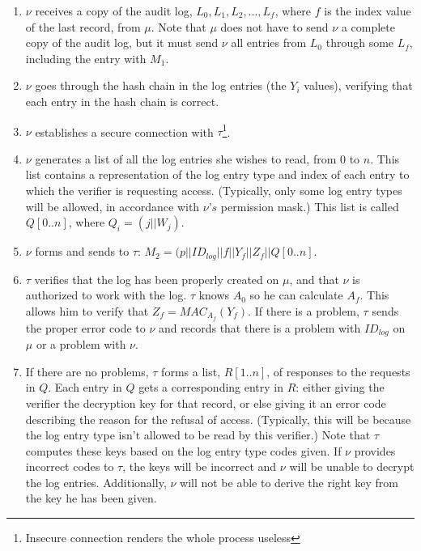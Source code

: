 \documentclass[12pt, letter]{article}
\begin{document}
\begin{enumerate}
    \item  $\nu$ receives a copy of the audit log, $L_0, L_1, L_2,...,L_f$, where $f$ is the index value of the last record, from $\mu$. Note that $\mu$ does not have to send $\nu$ a complete copy of the audit log, but it must send $\nu$ all entries from $L_0$ through some $L_f$, including the entry with $M_1$.
    
    \item $\nu$ goes through the hash chain in the log entries (the $Y_i$ values), verifying that each entry in the hash chain is correct.
    
    \item $\nu$ establishes a secure connection with $\tau$\footnote{Insecure connection renders the whole process useless}.

    \item $\nu$ generates a list of all the log entries she wishes to read, from $0$ to $n$. This list contains a representation of the log entry type and index of each entry to which the verifier is requesting access. (Typically, only some log entry types will be allowed, in accordance with $\nu’s$ permission mask.) This list is called $Q[0..n]$, where $Q_i = (j||W_j)$.
    
    \item $\nu$ forms and sends to $\tau$: $M_2 = (p||ID_{log}||f||Y_f||Z_f||Q[0..n]$.
    
    \item $\tau$ verifies that the log has been properly created on $\mu$, and that $\nu$ is authorized to work with the log. $\tau$ knows $A_0$ so he can calculate $A_f$. This allows him to verify that $Z_f = MAC_{A_f}(Y_f)$. If there is a problem, $\tau$ sends the proper error code to $\nu$ and records that there is a problem with $ID_{log}$ on $\mu$ or a problem with $\nu$.

    \item If there are no problems, $\tau$ forms a list, $R[1..n]$, of responses to the requests in $Q$. Each entry in $Q$ gets a corresponding entry in $R$: either giving the verifier the decryption key for that record, or else giving it an error code describing the reason for the refusal of access. (Typically, this will be because the log entry type isn’t allowed to be read by this verifier.) Note that $\tau$ computes these keys based on the log entry type codes given. If $\nu$ provides incorrect codes to $\tau$, the keys will be incorrect and $\nu$ will be unable to decrypt the log entries. Additionally, $\nu$ will not be able to derive the right key from the key he has been given.


\end{enumerate}
\end{document}
